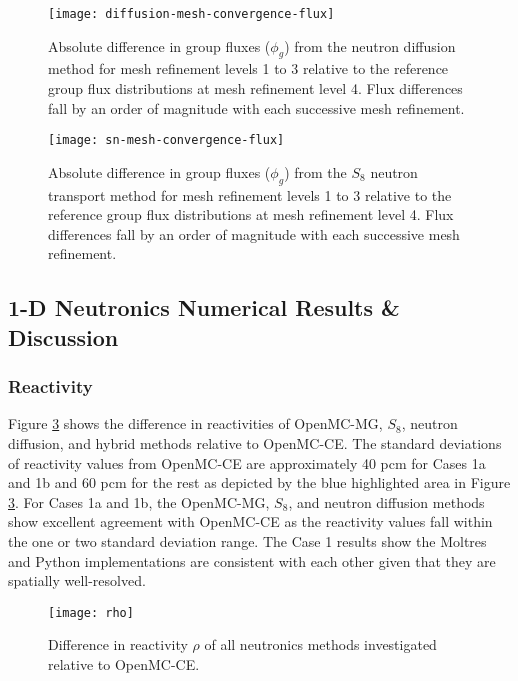 \begin{figure}[htb!]
  \centering
  \texttt{[image: diffusion-mesh-convergence-flux]}
  \caption{Absolute difference in group fluxes ($\phi_g$) from the neutron diffusion method for
  mesh refinement levels 1 to 3 relative to the reference group flux distributions at mesh
  refinement level 4. Flux differences fall by an order of magnitude with each successive mesh
  refinement.}
  \label{fig:diff-mesh-flux}
\end{figure}

\begin{figure}[htb!]
  \centering
  \texttt{[image: sn-mesh-convergence-flux]}
  \caption{Absolute difference in group fluxes ($\phi_g$) from the $S_8$ neutron transport method
  for mesh refinement levels 1 to 3 relative to the reference group flux distributions at mesh
  refinement level 4. Flux differences fall by an order of magnitude with each successive mesh
  refinement.}
  \label{fig:sn-mesh-flux}
\end{figure}

\FloatBarrier

\subsection{1-D Neutronics Numerical Results \& Discussion}

\subsubsection{Reactivity}

Figure \ref{fig:1d-rho} shows the difference in reactivities of OpenMC-MG, $S_8$,
neutron diffusion, and hybrid methods relative to OpenMC-CE. The standard deviations of
reactivity values from OpenMC-CE are approximately 40 pcm for Cases 1a and 1b and 60 pcm for the
rest as depicted by the blue highlighted area in Figure \ref{fig:1d-rho}. For Cases 1a and 1b, the
OpenMC-MG, $S_8$, and neutron diffusion methods show excellent agreement with OpenMC-CE as the
reactivity values fall within the one or two standard deviation range. The Case 1 results show
the Moltres and Python implementations are consistent with each other given that they are spatially
well-resolved.

\begin{figure}[htb!]
  \centering
  \texttt{[image: rho]}
  \caption{Difference in reactivity $\rho$ of all neutronics methods investigated relative
  to OpenMC-CE.}
  \label{fig:1d-rho}
\end{figure}

